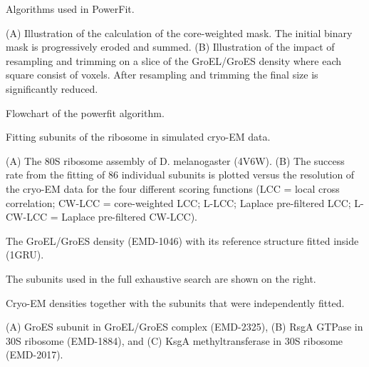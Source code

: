 \caption{Algorithms used in PowerFit.}{(A) Illustration of the calculation of the core-weighted mask. The
initial binary mask is progressively eroded and summed. (B) Illustration of the
impact of resampling and trimming on a slice of the GroEL/GroES density where
each square consist of  voxels. After resampling and trimming the
final size is significantly reduced.}
\stopbuffer


\caption{Flowchart of the powerfit algorithm.}{}
\stopbuffer


\caption{Fitting subunits of the ribosome in simulated cryo-EM data.}
{(A) The 80S ribosome assembly of D. melanogaster (4V6W). (B) The
success rate from the fitting of 86 individual subunits is plotted versus the
resolution of the cryo-EM data for the four different scoring functions (LCC =
local cross correlation; CW-LCC = core-weighted LCC; L-LCC; Laplace
pre-filtered LCC; L-CW-LCC = Laplace pre-filtered CW-LCC).} 
\stopbuffer


\caption{The GroEL/GroES density (EMD-1046) with its reference structure
fitted inside (1GRU).}
{The subunits used in the full exhaustive search are shown
on the right.}
\stopbuffer


\caption{Cryo-EM densities together with the subunits that were independently
fitted.}
{(A) GroES subunit in GroEL/GroES complex (EMD-2325), (B) RsgA GTPase in 30S
ribosome (EMD-1884), and (C) KsgA methyltransferase in 30S ribosome
(EMD-2017).}
\stopbuffer

